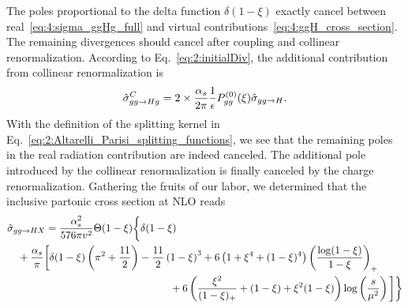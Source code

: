 The poles proportional to the delta function $\delta (1 - \xi)$ exactly cancel between real~\eqref{eq:4:sigma_ggHg_full} and virtual contributions~\eqref{eq:4:ggH_cross_section}. The remaining divergences should cancel after coupling and collinear renormalization. According to Eq.~\eqref{eq:2:initialDiv}, the additional contribution from collinear renormalization is
\begin{equation}
\hat{\sigma}_{gg \rightarrow Hg}^C = 2 \times \frac{\alpha_s}{2 \pi} \frac{1}{\epsilon} P_{gg}^{(0)}(\xi) \hat{\sigma}_{gg \rightarrow H}.
\end{equation}
With the definition of the splitting kernel in Eq.~\eqref{eq:2:Altarelli_Parisi_splitting_functions}, we see that the remaining poles in the real radiation contribution are indeed canceled. The additional pole introduced by the collinear renormalization is finally canceled by the charge renormalization. Gathering the fruits of our labor, we determined that the inclusive partonic cross section at \acs{NLO} reads
\begin{equation}
\begin{split}
& \hat{\sigma}_{gg \rightarrow HX} = \frac{\alphas^2}{576 \pi v^2} \Theta(1 - \xi) \bigg \lbrace \delta(1 - \xi) \\
& \quad + \frac{\alphas}{\pi} \bigg [ \delta(1 - \xi) \left(\pi^2 + \frac{11}{2} \right) - \frac{11}{2} \left(1 - \xi \right)^3 + 6 \left( 1 + \xi^4 + (1 - \xi)^4 \right) \left(\frac{\log (1 - \xi)}{1 - \xi} \right)_+ \\
& \hspace{5.5cm} + 6 \left( \frac{\xi^2}{(1 - \xi)_+} + (1 - \xi) + \xi^2 (1 - \xi) \right) \log \left(\frac{s}{\mu^2} \right) \bigg ] \bigg \rbrace
\end{split}
\label{eq:4:ggHX_NLO_HTL_cross_section}
\end{equation}

